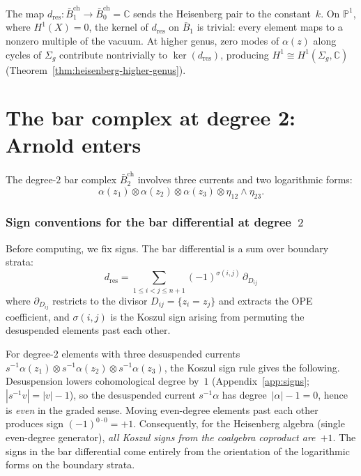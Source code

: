 \begin{remark}\label{rem:frame-ope-extraction}
The map $d_{\mathrm{res}}\colon \bar{B}^{\mathrm{ch}}_1 \to
\bar{B}^{\mathrm{ch}}_0 = \mathbb{C}$ sends the Heisenberg pair
to the constant~$k$. On $\mathbb{P}^1$, where $H^1(X) = 0$, the
kernel of $d_{\mathrm{res}}$ on $\bar{B}_1$ is trivial: every element
maps to a nonzero multiple of the vacuum. At higher genus, zero modes
of $\alpha(z)$ along cycles of $\Sigma_g$ contribute nontrivially to
$\ker(d_{\mathrm{res}})$, producing $H^1 \cong H^1(\Sigma_g, \mathbb{C})$
(Theorem~\ref{thm:heisenberg-higher-genus}).
\end{remark}

\section{The bar complex at degree 2: Arnold enters}
\label{sec:frame-bar-deg2}

The degree-$2$ bar complex $\bar{B}^{\mathrm{ch}}_2$ involves three
currents and two logarithmic forms:
\begin{equation}\label{eq:frame-bar2-element}
\alpha(z_1) \otimes \alpha(z_2) \otimes \alpha(z_3)
\otimes \eta_{12} \wedge \eta_{23}.
\end{equation}

\subsubsection*{Sign conventions for the bar differential at degree~$2$}

Before computing, we fix signs. The bar differential is a sum over
boundary strata:
\begin{equation}\label{eq:frame-d-sum-strata}
d_{\mathrm{res}} = \sum_{1 \leq i < j \leq n+1}
 (-1)^{\sigma(i,j)}\, \partial_{D_{ij}}
\end{equation}
where $\partial_{D_{ij}}$ restricts to the divisor
$D_{ij} = \{z_i = z_j\}$ and extracts the OPE coefficient, and
$\sigma(i,j)$ is the Koszul sign arising from permuting the
desuspended elements past each other.

For degree-$2$ elements with three desuspended currents
$s^{-1}\alpha(z_1) \otimes s^{-1}\alpha(z_2) \otimes s^{-1}\alpha(z_3)$,
the Koszul sign rule gives the following.
Desuspension lowers cohomological degree by~$1$
(Appendix~\ref{app:signs}; $|s^{-1}v| = |v| - 1$), so the
desuspended current $s^{-1}\alpha$ has degree~$|\alpha| - 1 = 0$,
hence is \emph{even} in the graded sense. Moving even-degree elements
past each other produces sign $(-1)^{0 \cdot 0} = +1$.
Consequently, for the Heisenberg algebra (single even-degree generator),
\emph{all Koszul signs from the coalgebra coproduct are~$+1$}.
The signs in the bar differential come entirely from the
orientation of the logarithmic forms on the boundary strata.

